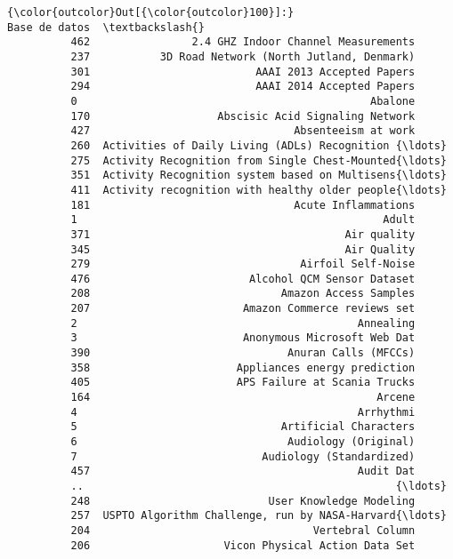 \documentclass[11pt]{article}
\begin{document}
\begin{Verbatim}[commandchars=\\\{\}]
{\color{outcolor}Out[{\color{outcolor}100}]:}                                          Base de datos  \textbackslash{}
          462                2.4 GHZ Indoor Channel Measurements   
          237           3D Road Network (North Jutland, Denmark)   
          301                          AAAI 2013 Accepted Papers   
          294                          AAAI 2014 Accepted Papers   
          0                                              Abalone   
          170                    Abscisic Acid Signaling Network   
          427                                Absenteeism at work   
          260  Activities of Daily Living (ADLs) Recognition {\ldots}   
          275  Activity Recognition from Single Chest-Mounted{\ldots}   
          351  Activity Recognition system based on Multisens{\ldots}   
          411  Activity recognition with healthy older people{\ldots}   
          181                                Acute Inflammations   
          1                                                Adult   
          371                                        Air quality   
          345                                        Air Quality   
          279                                 Airfoil Self-Noise   
          476                         Alcohol QCM Sensor Dataset   
          208                              Amazon Access Samples   
          207                        Amazon Commerce reviews set   
          2                                            Annealing   
          3                          Anonymous Microsoft Web Dat   
          390                               Anuran Calls (MFCCs)   
          358                       Appliances energy prediction   
          405                       APS Failure at Scania Trucks   
          164                                             Arcene   
          4                                            Arrhythmi   
          5                                Artificial Characters   
          6                                 Audiology (Original)   
          7                             Audiology (Standardized)   
          457                                          Audit Dat   
          ..                                                 {\ldots}   
          248                            User Knowledge Modeling   
          257  USPTO Algorithm Challenge, run by NASA-Harvard{\ldots}   
          204                                   Vertebral Column   
          206                     Vicon Physical Action Data Set   

\end{Verbatim}
\end{document}
